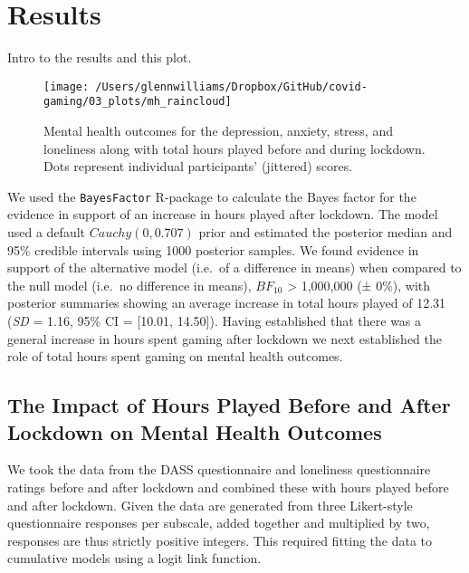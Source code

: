 \documentclass[
  english,
  jou,floatsintext]{apa6}
\begin{document}
\hypertarget{results}{%
\section{Results}\label{results}}

Intro to the results and this plot.

\begin{figure*}[!htbp]

{\centering \texttt{[image: /Users/glennwilliams/Dropbox/GitHub/covid-gaming/03\_plots/mh\_raincloud]} 

}

\caption{Mental health outcomes for the depression, anxiety, stress, and loneliness along with total hours played before and during lockdown. Dots represent individual participants' (jittered) scores.}\label{fig:mh-raincloud-plot}
\end{figure*}

We used the \texttt{BayesFactor} R-package to calculate the Bayes factor for the evidence in support of an increase in hours played after lockdown. The model used a default \(Cauchy(0, 0.707)\) prior and estimated the posterior median and 95\% credible intervals using 1000 posterior samples. We found evidence in support of the alternative model (i.e.~of a difference in means) when compared to the null model (i.e.~no difference in means), \(BF_{10}\) \textgreater{} 1,000,000 (± 0\%), with posterior summaries showing an average increase in total hours played of 12.31 (\emph{SD} = 1.16, 95\% CI = {[}10.01, 14.50{]}). Having established that there was a general increase in hours spent gaming after lockdown we next established the role of total hours spent gaming on mental health outcomes.

\hypertarget{the-impact-of-hours-played-before-and-after-lockdown-on-mental-health-outcomes}{%
\subsection{The Impact of Hours Played Before and After Lockdown on Mental Health Outcomes}\label{the-impact-of-hours-played-before-and-after-lockdown-on-mental-health-outcomes}}

We took the data from the DASS questionnaire and loneliness questionnaire ratings before and after lockdown and combined these with hours played before and after lockdown. Given the data are generated from three Likert-style questionnaire responses per subscale, added together and multiplied by two, responses are thus strictly positive integers. This required fitting the data to cumulative models using a logit link function.
\end{document}
